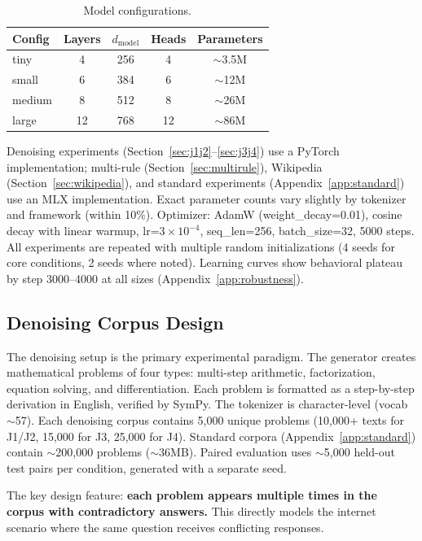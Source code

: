 \documentclass[10pt]{article} %
\begin{document}
\begin{table}[t]
\caption{Model configurations.}
\label{tab:configs}
\centering
\begin{tabular}{lcccc}
\toprule
Config & Layers & $d_{\text{model}}$ & Heads & Parameters \\
\midrule
tiny & 4 & 256 & 4 & ${\sim}$3.5M \\
small & 6 & 384 & 6 & ${\sim}$12M \\
medium & 8 & 512 & 8 & ${\sim}$26M \\
large & 12 & 768 & 12 & ${\sim}$86M \\
\bottomrule
\end{tabular}
\end{table}

Denoising experiments (Section~\ref{sec:j1j2}--\ref{sec:j3j4}) use a PyTorch implementation; multi-rule (Section~\ref{sec:multirule}), Wikipedia (Section~\ref{sec:wikipedia}), and standard experiments (Appendix~\ref{app:standard}) use an MLX implementation. Exact parameter counts vary slightly by tokenizer and framework (within 10\%). Optimizer: AdamW (weight\_decay=0.01), cosine decay with linear warmup, lr=$3 \times 10^{-4}$, seq\_len=256, batch\_size=32, 5000 steps. All experiments are repeated with multiple random initializations (4 seeds for core conditions, 2 seeds where noted). Learning curves show behavioral plateau by step 3000--4000 at all sizes (Appendix~\ref{app:robustness}).

\subsection{Denoising Corpus Design}
\label{sec:corpus}

The denoising setup is the primary experimental paradigm. The generator creates mathematical problems of four types: multi-step arithmetic, factorization, equation solving, and differentiation. Each problem is formatted as a step-by-step derivation in English, verified by SymPy. The tokenizer is character-level (vocab ${\sim}$57). Each denoising corpus contains 5,000 unique problems (10,000+ texts for J1/J2, 15,000 for J3, 25,000 for J4). Standard corpora (Appendix~\ref{app:standard}) contain ${\sim}$200,000 problems (${\sim}$36MB). Paired evaluation uses ${\sim}$5,000 held-out test pairs per condition, generated with a separate seed.

The key design feature: \textbf{each problem appears multiple times in the corpus with contradictory answers.} This directly models the internet scenario where the same question receives conflicting responses.
\end{document}
